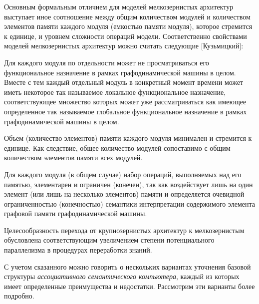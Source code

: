 Основным формальным отличием для моделей мелкозернистых архитектур выступает иное соотношение между общим количеством модулей и количеством элементов памяти каждого модуля (емкостью памяти модуля), которое стремится к единице, и уровнем сложности операций модели. Соответственно свойствами моделей мелкозернистых архитектур можно считать следующие [Кузьмицкий]:
\begin{textitemize}
\item Для каждого модуля по отдельности может не просматриваться его функциональное назначение в рамках графодинамической машины в целом. Вместе с тем каждый отдельный модуль в конкретный момент времени может иметь некоторое так называемое локальное функциональное назначение, соответствующее множество которых может уже рассматриваться как имеющее определенное так называемое глобальное функциональное назначение в рамках графодинамической машины в целом.
\item Объем (количество элементов) памяти каждого модуля минимален и стремится к единице. Как следствие, общее количество модулей сопоставимо с общим количеством элементов памяти всех модулей.
\item Для каждого модуля (в общем случае) набор операций, выполняемых над его памятью, элементарен и ограничен (конечен), так как воздействует лишь на один элемент (или лишь на несколько элементов) памяти и определяется очевидной ограниченностью (конечностью) семантики интерпретации содержимого элемента графовой памяти графодинамической машины.
\end{textitemize}

Целесообразность перехода от крупнозернистых архитектур к мелкозернистым обусловлена  соответствующим увеличением степени потенциального параллелизма в процедурах переработки знаний.

С учетом сказанного можно говорить о нескольких вариантах уточнения базовой структуры \textit{ассоциативного семантического компьютера}, каждый из которых имеет определенные  преимущества и недостатки. Рассмотрим эти варианты более подробно.

